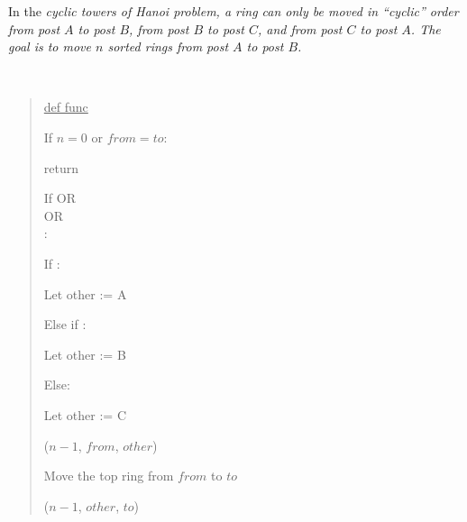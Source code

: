 \documentclass[10pt]{article}
\begin{document}
In the \it{cyclic towers of Hanoi} problem, a ring can only be moved in ``cyclic'' order from post \( A \) to post \( B \), from post \( B \) to post \( C \), and from post \( C \) to post \( A \). The goal is to move \( n \) sorted rings from post \( A \) to post \( B \).

\begin{solution}\ %
\begin{quote}
\noindent\ul{def func }%

%
\begin{steps}
  \item If \( n = 0 \) or \( from = to \):
    \begin{steps}
    \item return
    \end{steps}

  \item If \big[\( (from = A) \) AND \( (to = B) \)\big] OR \\
    \nf{\quad}\big[\( (from = B) \) AND \( (to = C) \)\big] OR \\
    \nf{\quad}\big[\( (from = C) \) AND \( (to = A) \)\big]: 
     \begin{steps}
      \item If :
        \begin{steps}
        \item Let other := A
        \end{steps}
      \item Else if :
        \begin{steps}
        \item Let other := B
        \end{steps}
      \item Else:
        \begin{steps}
        \item Let other := C
        \end{steps}
      \item {}(\( n - 1 \), \( from \), \( other \))
      \item Move the top ring from \( from \) to \( to \)
      \item {}(\( n - 1 \), \( other \), \( to \))
      \end{steps}


\end{steps}
\end{quote}
\end{solution}
\end{document}

